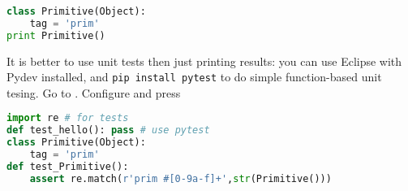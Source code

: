 \begin{lstlisting}[language=Python,title=/SYM.py]
class Primitive(Object):
    tag = 'prim'
print Primitive()
\end{lstlisting}
It is better to use unit tests then just printing results: you can use Eclipse
with Pydev installed, and \verb|pip install pytest| to do simple function-based
unit tesing. Go to
. Configure  and press
\begin{lstlisting}[language=Python]
import re # for tests
def test_hello(): pass # use pytest
class Primitive(Object):
    tag = 'prim'
def test_Primitive():
    assert re.match(r'prim #[0-9a-f]+',str(Primitive()))
\end{lstlisting}
